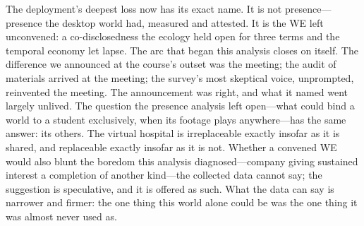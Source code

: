 The deployment's deepest loss now has its exact name. It is not
presence---presence the desktop world had, measured and attested. It
is the WE left unconvened: a co-disclosedness the ecology held open
for three terms and the temporal economy let lapse. The arc that
began this analysis closes on itself. The difference we announced at
the course's outset was the meeting; the audit of materials arrived
at the meeting; the survey's most skeptical voice, unprompted,
reinvented the meeting. The announcement was right, and what it named
went largely unlived. The question the presence analysis left
open---what could bind a world to a student exclusively, when its
footage plays anywhere---has the same answer: its others. The virtual
hospital is irreplaceable exactly insofar as it is shared, and
replaceable exactly insofar as it is not. Whether a convened WE would
also blunt the boredom this analysis diagnosed---company giving
sustained interest a completion of another kind---the collected data
cannot say; the suggestion is speculative, and it is offered as such.
What the data can say is narrower and firmer: the one thing this
world alone could be was the one thing it was almost never used as.



